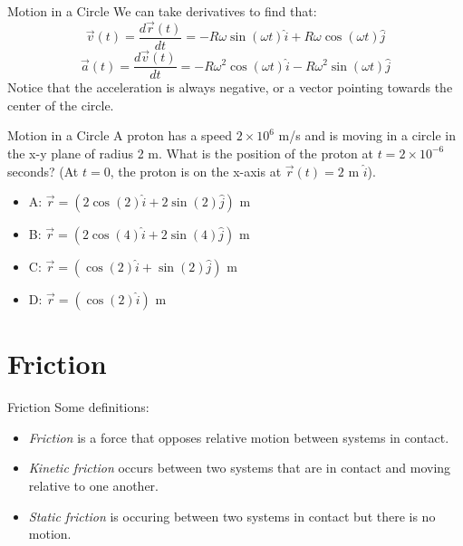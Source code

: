 \documentclass{beamer}
\begin{document}
\begin{frame}{Motion in a Circle}
We can take derivatives to find that:
\begin{equation}
\vec{v}(t) = \frac{d\vec{r}(t)}{dt} = -R\omega\sin(\omega t) \hat{i} + R\omega\cos(\omega t) \hat{j}
\end{equation}
\begin{equation}
\vec{a}(t) = \frac{d\vec{v}(t)}{dt} = -R\omega^2\cos(\omega t) \hat{i} - R\omega^2\sin(\omega t) \hat{j}
\end{equation}
Notice that the acceleration is always negative, or a vector pointing towards the center of the circle.
\end{frame}

\begin{frame}{Motion in a Circle}
A proton has a speed $2 \times 10^6$ m/s and is moving in a circle in the x-y plane of radius 2 m.  What is the position of the proton at $t = 2 \times 10^{-6}$ seconds?  (At $t=0$, the proton is on the x-axis at $\vec{r}(t) = 2$ m $\hat{i}$).
\begin{itemize}
\item A: $\vec{r} = (2\cos(2)\hat{i} + 2\sin(2)\hat{j})$ m
\item B: $\vec{r} = (2\cos(4)\hat{i} + 2\sin(4)\hat{j})$ m
\item C: $\vec{r} = (\cos(2)\hat{i} + \sin(2)\hat{j})$ m
\item D: $\vec{r} = (\cos(2)\hat{i})$ m
\end{itemize}
\end{frame}

\section{Friction}

\begin{frame}{Friction}
Some definitions: \\
\begin{itemize}
\item \textit{\alert{Friction}} is a force that opposes relative motion between systems in contact.
\item \textit{\alert{Kinetic friction}} occurs between two systems that are in contact and moving relative to one another.
\item \textit{\alert{Static friction}} is occuring between two systems in contact but there is no motion.
\end{itemize}
\end{frame}
\end{document}
